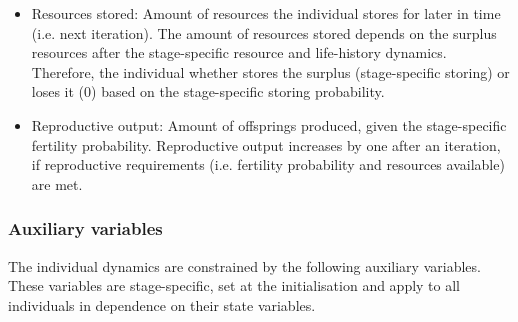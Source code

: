 \documentclass{article}
\begin{document}
\begin{itemize}
\begin{itemize}
        \item Resources stored: Amount of resources the individual stores for later in time (i.e. next iteration). The amount of resources stored depends on the surplus resources after the stage-specific resource and life-history dynamics. Therefore, the individual whether stores the surplus (stage-specific storing) or loses it (0) based on the stage-specific storing probability.
        \item Reproductive output: Amount of offsprings produced, given the stage-specific fertility probability. Reproductive output increases by one after an iteration, if reproductive requirements (i.e. fertility probability and resources available) are met.
    \end{itemize}
\end{itemize}

\subsubsection{Auxiliary variables}

The individual dynamics are constrained by the following auxiliary variables. These variables are stage-specific, set at the initialisation and apply to all individuals in dependence on their state variables.
\end{document}
